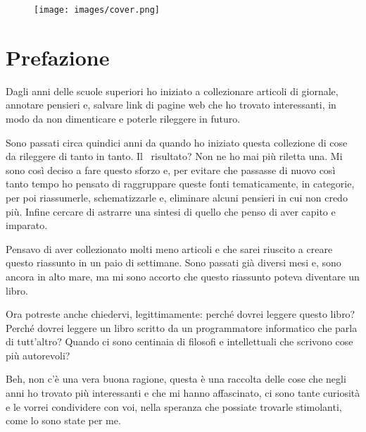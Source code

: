 \documentclass[12pt]{book} %
\date{2024-04-09}
\begin{document}
\begin{figure}[htbp]
    \centering
    \texttt{[image: images/cover.png]}
    \vspace{-\baselineskip} %
\end{figure}


\thispagestyle{empty}
\tableofcontents %
\markboth{}{}    %
\thispagestyle{empty}

\clearpage\section{Prefazione}
Dagli anni delle scuole superiori ho iniziato a collezionare articoli di giornale, annotare pensieri e, salvare link di
pagine web che ho trovato interessanti, in modo da non dimenticare e poterle rileggere in futuro.

Sono passati circa quindici anni da quando ho iniziato questa collezione di cose da rileggere di tanto in tanto. Il
\ risultato? Non ne ho mai più riletta una. Mi sono così deciso a fare questo sforzo e, per evitare che passasse di
nuovo così tanto tempo ho pensato di raggruppare queste fonti tematicamente, in categorie, per poi riassumerle,
schematizzarle e, eliminare alcuni pensieri in cui non credo più. Infine cercare di astrarre una sintesi di quello che
penso di aver capito e imparato. 

Pensavo di aver collezionato molti meno articoli e che sarei riuscito a creare questo riassunto in un paio di settimane.
Sono passati già diversi mesi e, sono ancora in alto mare, ma mi sono accorto che questo riassunto poteva diventare un
libro.

Ora potreste anche chiedervi, legittimamente: perché dovrei leggere questo libro? Perché dovrei leggere un libro scritto
da un programmatore informatico che parla di tutt'altro? Quando ci sono centinaia di filosofi e
intellettuali che scrivono cose più autorevoli?

Beh, non c'è una vera buona ragione, questa è una raccolta delle cose che negli anni ho trovato più
interessanti e che mi hanno affascinato, ci sono tante curiosità e le vorrei condividere con voi, nella speranza che
possiate trovarle stimolanti, come lo sono state per me.
\end{document}

